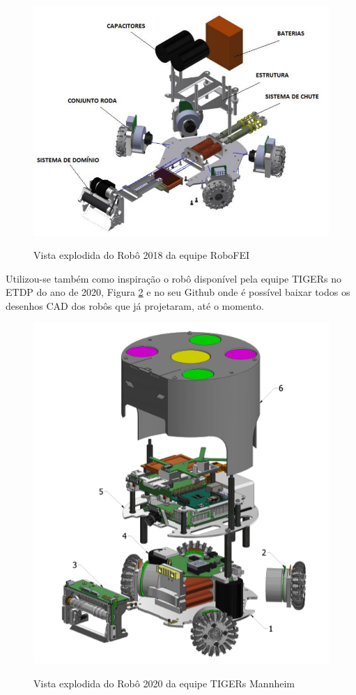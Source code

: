 \documentclass[deposito, acronym, symbols]{fei}
\begin{document}
\begin{figure}[!htb]
    \centering
    \caption{Vista explodida do Robô 2018 da equipe RoboFEI}
    \includegraphics[scale=0.5]{Imagens/vinirobo.png}
    \label{fig:vinirobo}
\end{figure}

Utilizou-se também como inspiração o robô disponível pela equipe TIGERs\textcite{tigers} no ETDP do ano de 2020, Figura \ref{fig:tigers}  e no seu Github \cite{tigersgit} onde é possível baixar todos os desenhos CAD dos robôs que já projetaram, até o momento.

\begin{figure}[!htb]
    \centering
    \caption{Vista explodida do Robô 2020 da equipe TIGERs Mannheim}
    \includegraphics[scale=0.5]{Imagens/tigers.png}
    \label{fig:tigers}
\end{figure}
\end{document}
